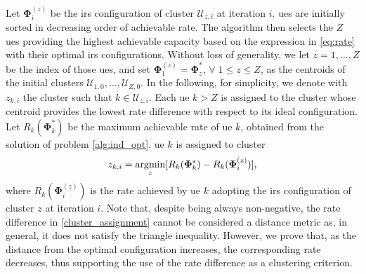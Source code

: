 Let $\bm{\Phi}^{(z)}_{i}$ be the \gls{irs} configuration of cluster $\mathcal{U}_{z, i}$ at iteration $i$.
\glspl{ue} are initially sorted in decreasing order of achievable rate.  The algorithm then selects the $Z$ \glspl{ue} providing the highest achievable capacity based on the expression in \eqref{eq:rate} with their optimal \gls{irs} configurations.  Without loss of generality, we let $z=1, \dots, Z$ be the  index of those \glspl{ue}, and set $\bm{\Phi}_1^{(z)} = \bm{\Phi}^*_z$, $\forall\; 1\leq z\leq Z$, as the centroids of the initial clusters $\mathcal{U}_{1, 0}, \ldots, \mathcal{U}_{Z, 0}$. 
In the following, for simplicity, we denote with $z_{k, i}$ the cluster such that $k \in \mathcal{U}_{z, i}$.  
Each \gls{ue} $k > Z$ is assigned to the cluster whose centroid provides the lowest rate difference with respect to its ideal configuration. Let $R_k(\bm{\Phi}^*_k)$ be the maximum achievable rate of \gls{ue} $k$, obtained from the solution of problem \eqref{alg:ind_opt}. \gls{ue} $k$ is assigned to cluster
\begin{equation}
\label{cluster_assignment}
    z_{k, i} = \operatorname*{\arg\!\min}_{\substack{z}} [R_k(\bm{\Phi}^*_k) - R_k(\bm{\Phi}^{(z)}_{i})] , 
\end{equation}
where $R_k(\bm{\Phi}^{(z)}_i)$ is the rate achieved by \gls{ue} $k$ adopting the \gls{irs} configuration of cluster $z$ at iteration $i$.
Note that, despite being always non-negative, the rate difference in \eqref{cluster_assignment} cannot be considered a distance metric as, in general, it does not satisfy the triangle inequality.
However, we prove that, as the distance from the optimal configuration increases, the corresponding rate decreases, thus supporting the use of the rate difference as a clustering criterion.

